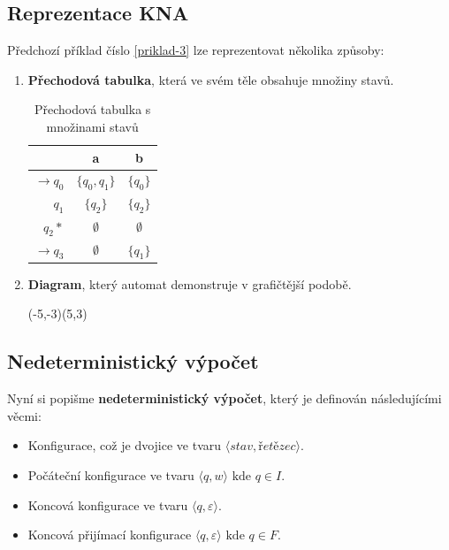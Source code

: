 \documentclass[10pt, a4paper, titlepage]{article}
\theoremstyle{note}
\begin{document}
\subsection{Reprezentace KNA}
Předchozí příklad číslo \ref{priklad-3} lze reprezentovat několika způsoby:
\begin{enumerate}
\item
\textbf{Přechodová tabulka}, která ve svém těle obsahuje množiny stavů.
\begin{table}[h]
\begin{center}
\begin{tabular}{ r || c | c }                   
   & a & b \\
   \hline
   $ \rightarrow q_{0} $ & $ \lbrace q_{0},q_{1} \rbrace $ & $ \lbrace q_{0} \rbrace $ \\
   $ q_{1} $ & $ \lbrace q_{2} \rbrace $ & $ \lbrace q_{2} \rbrace $ \\
   $ q_{2} * $ & $ \emptyset $ & $ \emptyset $ \\
   $ \rightarrow q_{3} $ & $ \emptyset $ & $ \lbrace q_{1} \rbrace $ \\ 
\end{tabular}
\end{center}
\caption{Přechodová tabulka s množinami stavů}
\end{table}

\item
\textbf{Diagram}, který automat demonstruje v grafičtější podobě.

\begin{center}
\begin{VCPicture}{(-5,-3)(5,3)}
\end{VCPicture}
\end{center}


\end{enumerate}

\subsection{Nedeterministický výpočet}
Nyní si popišme \textbf{nedeterministický výpočet}, který je definován následujícími věcmi:
\begin{itemize}
\item
Konfigurace, což je dvojice ve tvaru $\langle \textit{stav}, \textit{řetězec} \rangle $.
\item
Počáteční konfigurace ve tvaru $\langle q, w \rangle \text{ kde } q \in I$.
\item
Koncová konfigurace ve tvaru $\langle q, \varepsilon \rangle $.
\item
Koncová přijímací konfigurace $\langle q, \varepsilon \rangle \text{ kde } q \in F$.
\end{itemize}
\end{document}
